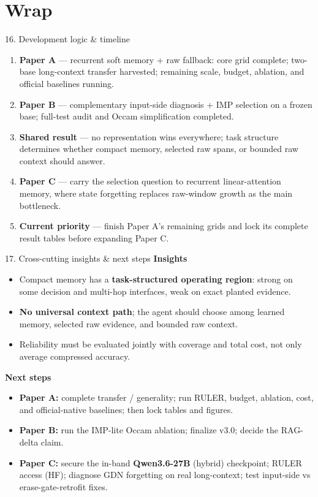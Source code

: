 \documentclass[aspectratio=169]{beamer}
\newcommand{\best}[1]{\textbf{#1}}
\begin{document}
\section{Wrap}
\begin{frame}{16. Development logic \& timeline}
  \begin{enumerate}\small
    \item \textbf{Paper A} --- recurrent soft memory + raw fallback: core grid complete; two-base long-context transfer harvested; remaining scale, budget, ablation, and official baselines running.
    \item \textbf{Paper B} --- complementary input-side diagnosis + IMP selection on a frozen base; full-test audit and Occam simplification completed.
    \item \textbf{Shared result} --- no representation wins everywhere; task structure determines whether compact memory, selected raw spans, or bounded raw context should answer.
    \item \textbf{Paper C} --- carry the selection question to recurrent linear-attention memory, where state forgetting replaces raw-window growth as the main bottleneck.
    \item \textbf{Current priority} --- finish Paper A's remaining grids and lock its complete result tables before expanding Paper C.
  \end{enumerate}
\end{frame}

\begin{frame}{17. Cross-cutting insights \& next steps}
  \textbf{Insights}
  \begin{itemize}\small
    \item Compact memory has a \best{task-structured operating region}: strong on some decision and multi-hop interfaces, weak on exact planted evidence.
    \item \best{No universal context path}; the agent should choose among learned memory, selected raw evidence, and bounded raw context.
    \item Reliability must be evaluated jointly with coverage and total cost, not only average compressed accuracy.
  \end{itemize}
  \textbf{Next steps}
  \begin{itemize}\small
    \item \textbf{Paper A:} complete transfer / generality; run RULER, budget, ablation, cost, and official-native baselines; then lock tables and figures.
    \item \textbf{Paper B:} run the IMP-lite Occam ablation; finalize v3.0; decide the RAG-delta claim.
    \item \textbf{Paper C:} secure the in-band \best{Qwen3.6-27B} (hybrid) checkpoint; RULER access (HF); diagnose GDN forgetting on real long-context; test input-side vs erase-gate-retrofit fixes.
  \end{itemize}
\end{frame}
\end{document}
